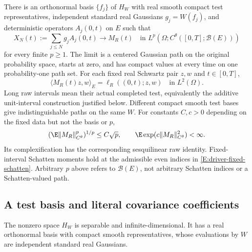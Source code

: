 \begin{proposition}\label{P:actual-operator-driver}
  There is an orthonormal basis $\{f_j\}$ of $H_W$ with real smooth compact
  test representatives, independent standard real Gaussians $g_j=W(f_j)$,
  and deterministic operators $A_j(0,t)$ on $E$ such that
  \begin{equation}\label{E:driver-path-convergence}
    X_N(t):=\sum_{j\le N}g_jA_j(0,t)\longrightarrow M_R(t)
    \quad\text{in }L^p(\Omega;C^\theta([0,T];\mathcal B(E)))
  \end{equation}
  for every finite $p\ge1$. The limit is a centered Gaussian path on the
  original probability space, starts at zero, and has compact values at
  every time on one probability-one path set. For each fixed real Schwartz
  pair $z,w$ and $t\in[0,T]$,
  \begin{equation}\label{E:driver-raw-row}
    \langle M_R(t)z,w\rangle_E=\ell_R((0,t);z,w)
    \quad\text{in }L^2(\Omega).
  \end{equation}
  Long raw intervals mean their actual completed test, equivalently the
  additive unit-interval construction justified below. Different compact
  smooth test bases give indistinguishable paths on the same $W$.
  For constants $C,c>0$ depending on the fixed data but not the basis or $p$,
  \begin{equation}\label{E:driver-gaussian-norm}
    (\E\|M_R\|_{C^\theta}^p)^{1/p}\le C\sqrt p,\qquad
    \E\exp(c\|M_R\|_{C^\theta}^2)<\infty.
  \end{equation}
  Its complexification has the corresponding sesquilinear raw identity.
  Fixed-interval Schatten moments hold at the admissible even indices in
  \eqref{E:driver-fixed-schatten}. Arbitrary $p$ above refers to
  $\mathcal B(E)$, not arbitrary Schatten indices or a Schatten-valued path.
\end{proposition}

\subsection{A test basis and literal covariance coefficients}

\begin{lemma}\label{L:driver-noise-basis}
  The nonzero space $H_W$ is separable and infinite-dimensional. It has
  a real orthonormal basis with compact smooth representatives, whose
  evaluations by $W$ are independent standard real Gaussians.
\end{lemma}

